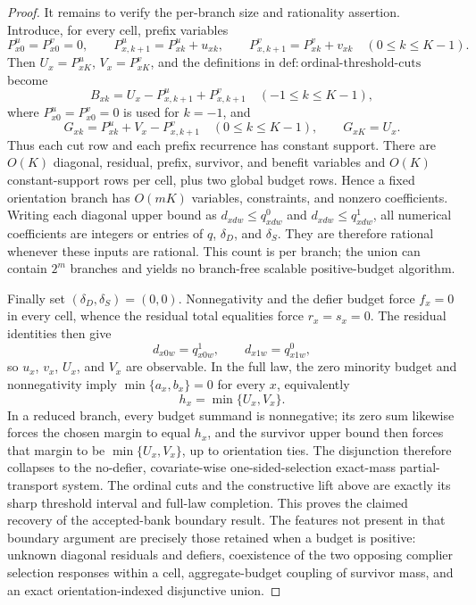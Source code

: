 \documentclass{article}
\begin{document}
\begin{proof}
It remains to verify the per-branch size and rationality assertion.  Introduce, for every cell, prefix variables
\[
 P^u_{x0}=P^v_{x0}=0,
 \qquad
 P^u_{x,k+1}=P^u_{xk}+u_{xk},
 \qquad
 P^v_{x,k+1}=P^v_{xk}+v_{xk}
 \quad(0\leq k\leq K-1).
\]
Then \(U_x=P^u_{xK}\), \(V_x=P^v_{xK}\), and the definitions in \(\mathrm{def:ordinal\text{-}threshold\text{-}cuts}\) become
\[
 B_{xk}=U_x-P^u_{x,k+1}+P^v_{x,k+1}
 \quad(-1\leq k\leq K-1),
\]
where \(P^u_{x0}=P^v_{x0}=0\) is used for \(k=-1\), and
\[
 G_{xk}=P^u_{xk}+V_x-P^v_{x,k+1}
 \quad(0\leq k\leq K-1),
 \qquad
 G_{xK}=U_x.
\]
Thus each cut row and each prefix recurrence has constant support.  There are \(O(K)\) diagonal, residual, prefix, survivor, and benefit variables and \(O(K)\) constant-support rows per cell, plus two global budget rows.  Hence a fixed orientation branch has \(O(mK)\) variables, constraints, and nonzero coefficients.  Writing each diagonal upper bound as \(d_{xdw}\leq q^0_{xdw}\) and \(d_{xdw}\leq q^1_{xdw}\), all numerical coefficients are integers or entries of \(q\), \(\delta_D\), and \(\delta_S\).  They are therefore rational whenever these inputs are rational.  This count is per branch; the union can contain \(2^m\) branches and yields no branch-free scalable positive-budget algorithm.

Finally set \((\delta_D,\delta_S)=(0,0)\).  Nonnegativity and the defier budget force \(f_x=0\) in every cell, whence the residual total equalities force \(r_x=s_x=0\).  The residual identities then give
\[
 d_{x0w}=q^1_{x0w},
 \qquad
 d_{x1w}=q^0_{x1w},
\]
so \(u_x\), \(v_x\), \(U_x\), and \(V_x\) are observable.  In the full law, the zero minority budget and nonnegativity imply \(\min\{a_x,b_x\}=0\) for every \(x\), equivalently
\[
 h_x=\min\{U_x,V_x\}.
\]
In a reduced branch, every budget summand is nonnegative; its zero sum likewise forces the chosen margin to equal \(h_x\), and the survivor upper bound then forces that margin to be \(\min\{U_x,V_x\}\), up to orientation ties.  The disjunction therefore collapses to the no-defier, covariate-wise one-sided-selection exact-mass partial-transport system.  The ordinal cuts and the constructive lift above are exactly its sharp threshold interval and full-law completion.  This proves the claimed recovery of the accepted-bank boundary result.  The features not present in that boundary argument are precisely those retained when a budget is positive: unknown diagonal residuals and defiers, coexistence of the two opposing complier selection responses within a cell, aggregate-budget coupling of survivor mass, and an exact orientation-indexed disjunctive union.
\end{proof}
\end{document}
